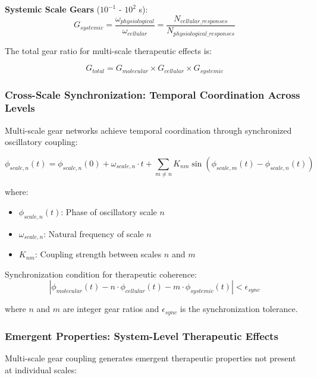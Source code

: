 \documentclass[12pt,a4paper]{article}
\begin{document}
\textbf{Systemic Scale Gears} ($10^{-1}$ - $10^{2}$ s):
\begin{equation}
G_{systemic} = \frac{\omega_{physiological}}{\omega_{cellular}} = \frac{N_{cellular\_responses}}{N_{physiological\_responses}}
\end{equation}

The total gear ratio for multi-scale therapeutic effects is:

\begin{equation}
G_{total} = G_{molecular} \times G_{cellular} \times G_{systemic}
\end{equation}

\subsubsection{Cross-Scale Synchronization: Temporal Coordination Across Levels}

Multi-scale gear networks achieve temporal coordination through synchronized oscillatory coupling:

\begin{equation}
\phi_{scale,n}(t) = \phi_{scale,n}(0) + \omega_{scale,n} \cdot t + \sum_{m \neq n} K_{nm} \sin(\phi_{scale,m}(t) - \phi_{scale,n}(t))
\end{equation}

where:
\begin{itemize}
\item $\phi_{scale,n}(t)$: Phase of oscillatory scale $n$
\item $\omega_{scale,n}$: Natural frequency of scale $n$
\item $K_{nm}$: Coupling strength between scales $n$ and $m$
\end{itemize}

Synchronization condition for therapeutic coherence:
\begin{equation}
|\phi_{molecular}(t) - n \cdot \phi_{cellular}(t) - m \cdot \phi_{systemic}(t)| < \epsilon_{sync}
\end{equation}

where $n$ and $m$ are integer gear ratios and $\epsilon_{sync}$ is the synchronization tolerance.

\subsubsection{Emergent Properties: System-Level Therapeutic Effects}

Multi-scale gear coupling generates emergent therapeutic properties not present at individual scales:
\end{document}
